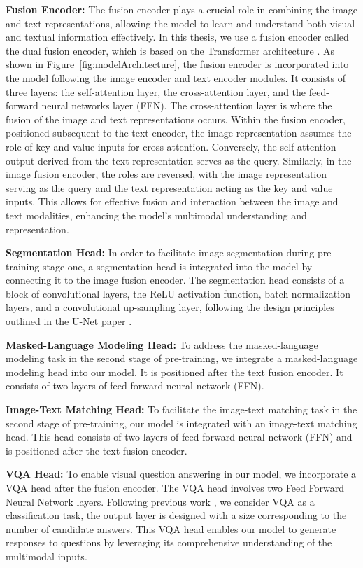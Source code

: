 {\bf Fusion Encoder:} 
The fusion encoder plays a crucial role in combining the image and text representations, allowing the model to learn and understand both visual and textual information effectively. In this thesis, we use a fusion encoder called the dual fusion encoder, which is based on the Transformer architecture \cite{vaswani2017attention}. As shown in Figure~\ref{fig:modelArchitecture}, the fusion encoder is incorporated into the model following the image encoder and text encoder modules. It consists of three layers: the self-attention layer, the cross-attention layer, and the feed-forward neural networks layer (FFN). The cross-attention layer is where the fusion of the image and text representations occurs. Within the fusion encoder, positioned subsequent to the text encoder, the image representation assumes the role of key and value inputs for cross-attention. Conversely, the self-attention output derived from the text representation serves as the query. Similarly, in the image fusion encoder, the roles are reversed, with the image representation serving as the query and the text representation acting as the key and value inputs. This allows for effective fusion and interaction between the image and text modalities, enhancing the model's multimodal understanding and representation.

{\bf Segmentation Head:}
In order to facilitate image segmentation during pre-training stage one, a segmentation head is integrated into the model by connecting it to the image fusion encoder. The segmentation head consists of a block of convolutional layers, the ReLU activation function, batch normalization layers, and a convolutional up-sampling layer, following the design principles outlined in the U-Net paper \cite{ronneberger2015u}. 

{\bf Masked-Language Modeling Head:}
To address the masked-language modeling task in the second stage of pre-training, we integrate a masked-language modeling head into our model. It is positioned after the text fusion encoder. It consists of two layers of feed-forward neural network (FFN).

{\bf Image-Text Matching Head:}
To facilitate the image-text matching task in the second stage of pre-training, our model is integrated with an image-text matching head. This head consists of two layers of feed-forward neural network (FFN) and is positioned after the text fusion encoder.

{\bf VQA Head:}
To enable visual question answering in our model, we incorporate a VQA head after the fusion encoder. The VQA head involves two Feed Forward Neural Network layers. Following previous work \cite{chen2022align, chen2022multi}, we consider VQA as a classification task, the output layer is designed with a size corresponding to the number of candidate answers. This VQA head enables our model to generate responses to questions by leveraging its comprehensive understanding of the multimodal inputs.

